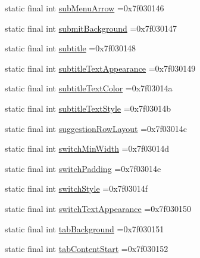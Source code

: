 \begin{DoxyCompactItemize}
\item 
static final int \mbox{\hyperlink{classbr_1_1unb_1_1cic_1_1mp_1_1marketmaster_1_1R_1_1attr_a203f41e3c737b654f5fac02a345e4d59}{sub\+Menu\+Arrow}} =0x7f030146
\item 
static final int \mbox{\hyperlink{classbr_1_1unb_1_1cic_1_1mp_1_1marketmaster_1_1R_1_1attr_a5df1223af7cb6acd3a89ebc39ec0a418}{submit\+Background}} =0x7f030147
\item 
static final int \mbox{\hyperlink{classbr_1_1unb_1_1cic_1_1mp_1_1marketmaster_1_1R_1_1attr_adae38c5461ad50c4619e4a5831242ff7}{subtitle}} =0x7f030148
\item 
static final int \mbox{\hyperlink{classbr_1_1unb_1_1cic_1_1mp_1_1marketmaster_1_1R_1_1attr_a738987660ce1c614b0959cc0f2c11579}{subtitle\+Text\+Appearance}} =0x7f030149
\item 
static final int \mbox{\hyperlink{classbr_1_1unb_1_1cic_1_1mp_1_1marketmaster_1_1R_1_1attr_af522acc915726b0b4f30cc80a1ba117e}{subtitle\+Text\+Color}} =0x7f03014a
\item 
static final int \mbox{\hyperlink{classbr_1_1unb_1_1cic_1_1mp_1_1marketmaster_1_1R_1_1attr_ac776930f274776ecf25a98da3499b7b7}{subtitle\+Text\+Style}} =0x7f03014b
\item 
static final int \mbox{\hyperlink{classbr_1_1unb_1_1cic_1_1mp_1_1marketmaster_1_1R_1_1attr_ab55cb82d58c03b036697134199cd8334}{suggestion\+Row\+Layout}} =0x7f03014c
\item 
static final int \mbox{\hyperlink{classbr_1_1unb_1_1cic_1_1mp_1_1marketmaster_1_1R_1_1attr_a6b9bcfa4cbafa32cc24ace22810b7ca0}{switch\+Min\+Width}} =0x7f03014d
\item 
static final int \mbox{\hyperlink{classbr_1_1unb_1_1cic_1_1mp_1_1marketmaster_1_1R_1_1attr_ac69e105a0ec078d83dccf2909e5686c5}{switch\+Padding}} =0x7f03014e
\item 
static final int \mbox{\hyperlink{classbr_1_1unb_1_1cic_1_1mp_1_1marketmaster_1_1R_1_1attr_ab0db5f9323af2c4160768b9db9dff201}{switch\+Style}} =0x7f03014f
\item 
static final int \mbox{\hyperlink{classbr_1_1unb_1_1cic_1_1mp_1_1marketmaster_1_1R_1_1attr_a71454299a7f86f8d6d67443335771a2a}{switch\+Text\+Appearance}} =0x7f030150
\item 
static final int \mbox{\hyperlink{classbr_1_1unb_1_1cic_1_1mp_1_1marketmaster_1_1R_1_1attr_a38ad7cfc48c2057e84b930cb113b23b7}{tab\+Background}} =0x7f030151
\item 
static final int \mbox{\hyperlink{classbr_1_1unb_1_1cic_1_1mp_1_1marketmaster_1_1R_1_1attr_aa8f6ecc30bafd72732b85613b10b5a12}{tab\+Content\+Start}} =0x7f030152

\end{DoxyCompactItemize}
